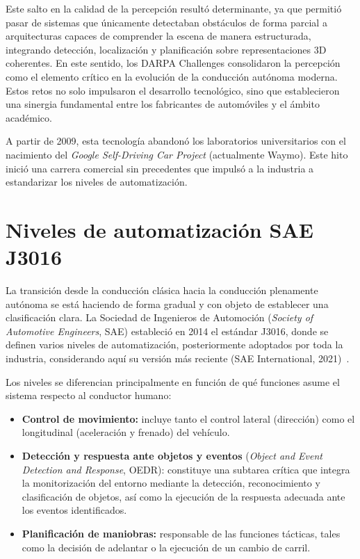 Este salto en la calidad de la percepción resultó determinante, ya que
permitió pasar de sistemas que únicamente detectaban obstáculos de
forma parcial a arquitecturas capaces de comprender la escena de manera
estructurada, integrando detección, localización y planificación sobre
representaciones 3D coherentes. En este sentido, los DARPA Challenges
consolidaron la percepción como el elemento crítico en la evolución de
la conducción autónoma moderna. Estos retos no solo impulsaron el
desarrollo tecnológico, sino que establecieron una sinergia fundamental
entre los fabricantes de automóviles y el ámbito académico.

A partir de 2009, esta tecnología abandonó los laboratorios
universitarios con el nacimiento del \textit{Google Self-Driving Car
Project} (actualmente Waymo). Este hito inició una carrera comercial
sin precedentes que impulsó a la industria a estandarizar los niveles
de automatización.

\section{Niveles de automatización SAE J3016}
\label{sec:sae-j3016}

La transición desde la conducción clásica hacia la conducción
plenamente autónoma se está haciendo de forma gradual y con objeto de
establecer una clasificación clara. La Sociedad de Ingenieros de
Automoción (\textit{Society of Automotive Engineers}, SAE) estableció
en 2014 el estándar J3016, donde se definen varios niveles de
automatización, posteriormente adoptados por toda la industria,
considerando aquí su versión más reciente (SAE International,
2021)~\cite{sae2021j3016}.

Los niveles se diferencian principalmente en función de qué funciones
asume el sistema respecto al conductor humano:

\begin{itemize}
    \item \textbf{Control de movimiento:} incluye tanto el control
    lateral (dirección) como el longitudinal (aceleración y frenado)
    del vehículo.
    \item \textbf{Detección y respuesta ante objetos y eventos}
    (\textit{Object and Event Detection and Response}, OEDR):
    constituye una subtarea crítica que integra la monitorización del
    entorno mediante la detección, reconocimiento y clasificación de
    objetos, así como la ejecución de la respuesta adecuada ante los
    eventos identificados.
    \item \textbf{Planificación de maniobras:} responsable de las
    funciones tácticas, tales como la decisión de adelantar o la
    ejecución de un cambio de carril.
\end{itemize}

